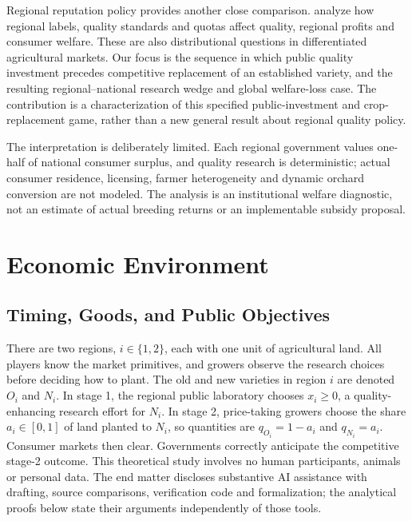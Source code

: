 \documentclass[USenglish]{article}
\begin{document}
Regional reputation policy provides another close comparison. \citet{winfree2022reputations} analyze how regional labels, quality standards and quotas affect quality, regional profits and consumer welfare. These are also distributional questions in differentiated agricultural markets. Our focus is the sequence in which public quality investment precedes competitive replacement of an established variety, and the resulting regional--national research wedge and global welfare-loss case. The contribution is a characterization of this specified public-investment and crop-replacement game, rather than a new general result about regional quality policy.

The interpretation is deliberately limited. Each regional government values one-half of national consumer surplus, and quality research is deterministic; actual consumer residence, licensing, farmer heterogeneity and dynamic orchard conversion are not modeled. The analysis is an institutional welfare diagnostic, not an estimate of actual breeding returns or an implementable subsidy proposal.

\section{Economic Environment}
\subsection{Timing, Goods, and Public Objectives}
There are two regions, $i\in\{1,2\}$, each with one unit of agricultural land. All players know the market primitives, and growers observe the research choices before deciding how to plant. The old and new varieties in region $i$ are denoted $O_i$ and $N_i$. In stage 1, the regional public laboratory chooses $x_i\geq 0$, a quality-enhancing research effort for $N_i$. In stage 2, price-taking growers choose the share $a_i\in[0,1]$ of land planted to $N_i$, so quantities are $q_{O_i}=1-a_i$ and $q_{N_i}=a_i$. Consumer markets then clear. Governments correctly anticipate the competitive stage-2 outcome. This theoretical study involves no human participants, animals or personal data. The end matter discloses substantive AI assistance with drafting, source comparisons, verification code and formalization; the analytical proofs below state their arguments independently of those tools.
\end{document}
